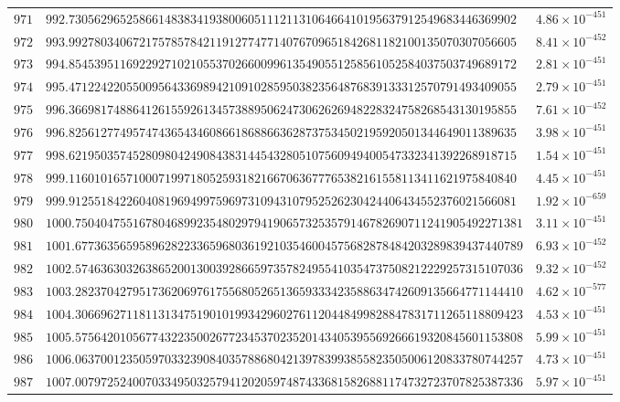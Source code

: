 \documentclass[12pt,reqno]{amsart}
\theoremstyle{remark}
\begin{document}
\begin{longtable}{clc}
$971$ & $992.7305629652586614838341938006051112113106466410195637912549683446369902$ & $4.86\times 10^{-451}$ \\
$972$ & $993.9927803406721757857842119127747714076709651842681182100135070307056605$ & $8.41\times 10^{-452}$ \\
$973$ & $994.8545395116922927102105537026600996135490551258561052584037503749689172$ & $2.81\times 10^{-451}$ \\
$974$ & $995.4712242205500956433698942109102859503823564876839133312570791493409055$ & $2.79\times 10^{-451}$ \\
$975$ & $996.3669817488641261559261345738895062473062626948228324758268543130195855$ & $7.61\times 10^{-452}$ \\
$976$ & $996.8256127749574743654346086618688663628737534502195920501344649011389635$ & $3.98\times 10^{-451}$ \\
$977$ & $998.6219503574528098042490843831445432805107560949400547332341392268918715$ & $1.54\times 10^{-451}$ \\
$978$ & $999.1160101657100071997180525931821667063677765382161558113411621975840840$ & $4.45\times 10^{-451}$ \\
$979$ & $999.9125518422604081969499759697310943107952526230424406434552376021566081$ & $1.92\times 10^{-659}$ \\
$980$ & $1000.7504047551678046899235480297941906573253579146782690711241905492271381$ & $3.11\times 10^{-451}$ \\
$981$ & $1001.6773635659589628223365968036192103546004575682878484203289839437440789$ & $6.93\times 10^{-452}$ \\
$982$ & $1002.5746363032638652001300392866597357824955410354737508212229257315107036$ & $9.32\times 10^{-452}$ \\
$983$ & $1003.2823704279517362069761755680526513659333423588634742609135664771144410$ & $4.62\times 10^{-577}$ \\
$984$ & $1004.3066962711811313475190101993429602761120448499828847831711265118809423$ & $4.53\times 10^{-451}$ \\
$985$ & $1005.5756420105677432235002677234537023520143405395569266619320845601153808$ & $5.99\times 10^{-451}$ \\
$986$ & $1006.0637001235059703323908403578868042139783993855823505006120833780744257$ & $4.73\times 10^{-451}$ \\
$987$ & $1007.0079725240070334950325794120205974874336815826881174732723707825387336$ & $5.97\times 10^{-451}$ \\

\end{longtable}
\end{document}
